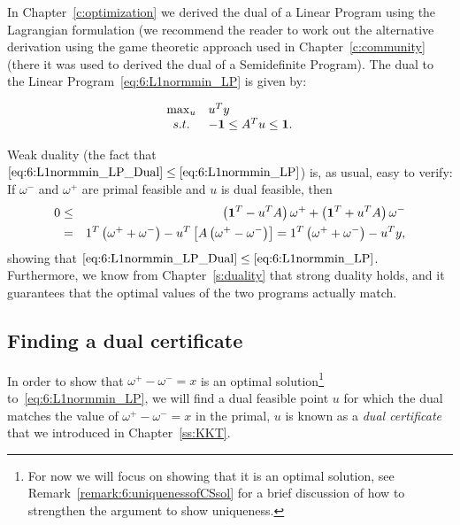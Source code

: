 In Chapter~\ref{c:optimization} we derived the dual of a Linear Program using the Lagrangian formulation (we recommend the reader to work out the alternative derivation using the game theoretic approach used in Chapter~\ref{c:community} (there it was used to derived the dual of a Semidefinite Program). The dual to the Linear Program~\eqref{eq:6:L1normmin_LP} is given by:



\begin{equation}\label{eq:6:L1normmin_LP_Dual}
\begin{array}{cl}
\max_u & u^Ty \\
s.t. & -\mathbf{1} \leq A^Tu   \leq  \mathbf{1}.
\end{array}
\end{equation}



Weak duality (the fact that $\eqref{eq:6:L1normmin_LP_Dual}\leq\eqref{eq:6:L1normmin_LP}$) is, as usual, easy to verify: 
If $\omega^{-}$ and $\omega^{+}$ are primal feasible and $u$ is dual feasible, then
\begin{eqnarray}\label{eq:6:weakduality}
0 & \leq & \left( \mathbf{1}^T - u^TA \right) \omega^{+} +  \left( \mathbf{1}^T + u^TA \right) \omega^{-} \label{eq:6:weakduality} \\  &= & 1^T\left( \omega^{+} + \omega^{-} \right) - u^T\left[ A\left( \omega^{+} - \omega^{-} \right)\right] = 1^T\left( \omega^{+} + \omega^{-} \right) - u^Ty, \nonumber
\end{eqnarray}
showing that $\eqref{eq:6:L1normmin_LP_Dual}\leq\eqref{eq:6:L1normmin_LP}$. 
Furthermore, we know from Chapter~\ref{s:duality} that strong duality holds, and it guarantees that the optimal values of the two programs actually match.

\subsection{Finding a dual certificate}

In order to show that $\omega^{+} - \omega^{-} = x$ is an optimal solution\footnote{For now we will focus on showing that it is an optimal solution, see Remark~\ref{remark:6:uniquenessofCSsol} for a brief discussion of how to strengthen the argument to show uniqueness.} to~\eqref{eq:6:L1normmin_LP}, we will find a dual feasible point $u$ for which the dual matches the value of $\omega^{+} - \omega^{-} = x$ in the primal, $u$ is known as a \emph{dual certificate} that we introduced in Chapter~\ref{ss:KKT}.

